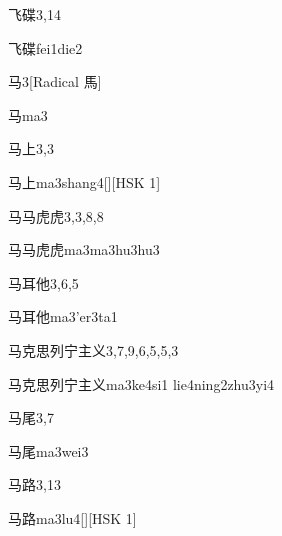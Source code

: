 \begin{entry}{飞碟}{3,14}
  \begin{phonetics}{飞碟}{fei1die2}
  \end{phonetics}
\end{entry}

\begin{entry}{马}{3}[Radical 馬]
  \begin{phonetics}{马}{ma3}
  \end{phonetics}
\end{entry}

\begin{entry}{马上}{3,3}
  \begin{phonetics}{马上}{ma3shang4}[][HSK 1]
  \end{phonetics}
\end{entry}

\begin{entry}{马马虎虎}{3,3,8,8}
  \begin{phonetics}{马马虎虎}{ma3ma3hu3hu3}
  \end{phonetics}
\end{entry}

\begin{entry}{马耳他}{3,6,5}
  \begin{phonetics}{马耳他}{ma3'er3ta1}
  \end{phonetics}
\end{entry}

\begin{entry}{马克思列宁主义}{3,7,9,6,5,5,3}
  \begin{phonetics}{马克思列宁主义}{ma3ke4si1 lie4ning2zhu3yi4}
  \end{phonetics}
\end{entry}

\begin{entry}{马尾}{3,7}
  \begin{phonetics}{马尾}{ma3wei3}
  \end{phonetics}
\end{entry}

\begin{entry}{马路}{3,13}
  \begin{phonetics}{马路}{ma3lu4}[][HSK 1]
  \end{phonetics}
\end{entry}


